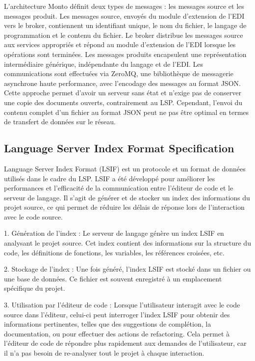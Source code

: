 L'architecture Monto définit deux types de messages : les messages source et les messages produit. Les messages source, envoyés du module d'extension de l'EDI vers le broker, contiennent un identifiant unique, le nom du fichier, le langage de programmation et le contenu du fichier. Le broker distribue les messages source aux services appropriés et répond au module d'extension de l'EDI lorsque les opérations sont terminées. Les messages produits encapsulent une représentation intermédiaire générique, indépendante du langage et de l'EDI. Les communications sont effectuées via ZeroMQ, une bibliothèque de messagerie asynchrone haute performance, avec l'encodage des messages au format JSON. Cette approche permet d'avoir un serveur sans état et n'exige pas de conserver une copie des documents ouverts, contrairement au LSP. Cependant, l'envoi du contenu complet d'un fichier au format JSON peut ne pas être optimal en termes de transfert de données sur le réseau.


\subsection{Language Server Index Format Specification}

Language Server Index Format (LSIF) est un protocole et un format de données utilisés dans le cadre du LSP. LSIF a été développé pour améliorer les performances et l'efficacité de la communication entre l'éditeur de code et le serveur de langage. Il s'agit de générer et de stocker un index des informations du projet source, ce qui permet de réduire les délais de réponse lors de l'interaction avec le code source.

1. Génération de l'index : Le serveur de langage génère un index LSIF en analysant le projet source. Cet index contient des informations sur la structure du code, les définitions de fonctions, les variables, les références croisées, etc.

2. Stockage de l'index : Une fois généré, l'index LSIF est stocké dans un fichier ou une base de données. Ce fichier est souvent enregistré à un emplacement spécifique du projet.

3. Utilisation par l'éditeur de code : Lorsque l'utilisateur interagit avec le code source dans l'éditeur, celui-ci peut interroger l'index LSIF pour obtenir des informations pertinentes, telles que des suggestions de complétion, la documentation, ou pour effectuer des actions de refactoring. Cela permet à l'éditeur de code de répondre plus rapidement aux demandes de l'utilisateur, car il n'a pas besoin de re-analyser tout le projet à chaque interaction.

